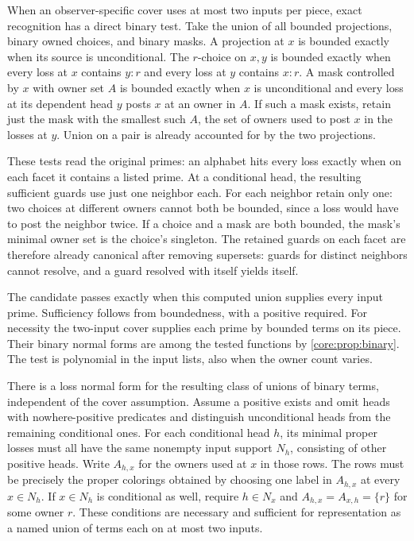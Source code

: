 When an observer-specific cover uses at most two
inputs per piece, exact recognition has a direct
binary test. Take the union of all bounded
projections, binary owned choices, and binary
masks. A projection at $x$ is bounded exactly
when its source is unconditional. The $r$-choice
on $x,y$ is bounded exactly when every loss at
$x$ contains $y:r$ and every loss at $y$ contains
$x:r$. A mask controlled by $x$ with owner set
$A$ is bounded exactly when $x$ is unconditional
and every loss at its dependent head $y$ posts
$x$ at an owner in $A$. If such a mask exists,
retain just the mask with the smallest such
$A$, the set of owners used to post $x$ in
the losses at $y$. Union on a pair is already
accounted for by the two projections.

These tests read the original primes: an
alphabet hits every loss exactly when on
each facet it contains a listed prime.
At a conditional head, the resulting
sufficient guards use just one neighbor
each. For each neighbor retain only one:
two choices at different owners cannot
both be bounded, since a loss would have
to post the neighbor twice. If a choice
and a mask are both bounded, the mask's
minimal owner set is the choice's singleton.
The retained guards on each facet are
therefore already canonical after removing
supersets: guards for distinct neighbors
cannot resolve, and a guard resolved with
itself yields itself.

The candidate passes exactly when this
computed union supplies every input prime.
Sufficiency follows from boundedness, with
a positive required. For necessity the
two-input cover supplies each prime by
bounded terms on its piece. Their binary
normal forms are among the tested functions
by \cref{core:prop:binary}. The test is
polynomial in the input lists, also when
the owner count varies.

There is a loss normal form for the resulting
class of unions of binary terms, independent
of the cover assumption. Assume a positive
exists and omit heads with
nowhere-positive predicates and distinguish
unconditional heads from the remaining
conditional ones. For each conditional head
$h$, its minimal proper losses must all
have the same nonempty input support $N_h$,
consisting of other positive heads. Write
$A_{h,x}$ for the owners used at $x$ in
those rows. The rows must be precisely
the proper colorings obtained by choosing
one label in $A_{h,x}$ at every $x\in N_h$.
If $x\in N_h$ is conditional as well,
require $h\in N_x$ and
$A_{h,x}=A_{x,h}=\{r\}$ for some owner $r$.
These conditions are necessary and sufficient
for representation as a named union of terms
each on at most two inputs.

